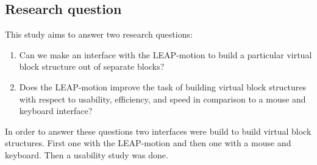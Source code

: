 \subsection{Research question}
This study aims to answer two research questions:
\begin{enumerate}
\item Can we make an interface with the LEAP-motion to build a particular virtual block structure out of separate blocks?
\item Does the LEAP-motion improve the task of building virtual block structures with respect to usability, efficiency, and speed in comparison to a mouse and keyboard interface?
\end{enumerate}
In order to answer these questions two interfaces were build to build virtual block structures. First one with the LEAP-motion and then one with a mouse and keyboard. Then a usability study was done.